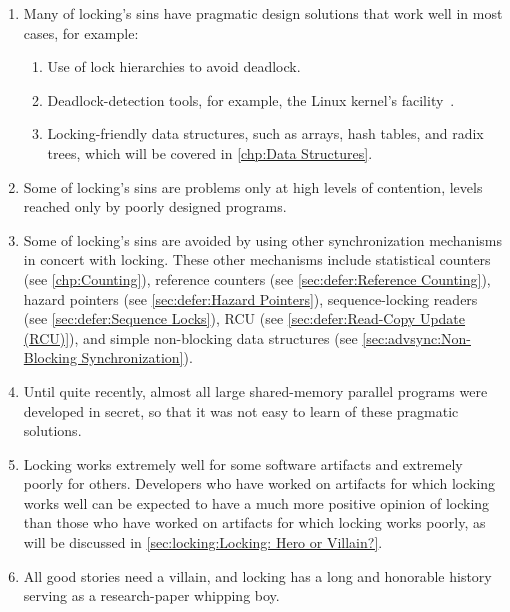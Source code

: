 \begin{enumerate}
\item	Many of locking's sins have pragmatic design solutions that
	work well in most cases, for example:
	\begin{enumerate}
	\item	Use of lock hierarchies to avoid deadlock.
	\item	Deadlock-detection tools, for example, the Linux kernel's
		 facility~\cite{JonathanCorbet2006lockdep}.
	\item	Locking-friendly data structures, such as
		arrays, hash tables, and radix trees, which will
		be covered in \cref{chp:Data Structures}.
	\end{enumerate}
\item	Some of locking's sins are problems only at high levels of
	contention, levels reached only by poorly designed programs.
\item	Some of locking's sins are avoided by using other synchronization
	mechanisms in concert with locking.
	These other mechanisms include
	statistical counters
	(see \cref{chp:Counting}),
	reference counters
	(see \cref{sec:defer:Reference Counting}),
	hazard pointers
	(see \cref{sec:defer:Hazard Pointers}),
	sequence-locking readers
	(see \cref{sec:defer:Sequence Locks}),
	RCU
	(see \cref{sec:defer:Read-Copy Update (RCU)}),
	and simple non-blocking data structures
	(see \cref{sec:advsync:Non-Blocking Synchronization}).
\item	Until quite recently, almost all large shared-memory parallel
	programs were developed in secret, so that it was not easy
	to learn of these pragmatic solutions.
\item	Locking works extremely well for some software artifacts
	and extremely poorly for others.
	Developers who have worked on artifacts for which locking
	works well can be expected to have a much more positive
	opinion of locking than those who have worked on artifacts
	for which locking works poorly, as will be discussed in
	\cref{sec:locking:Locking: Hero or Villain?}.
\item	All good stories need a villain, and locking has a long and
	honorable history serving as a research-paper whipping boy.
\end{enumerate}

\QuickQuizEnd

